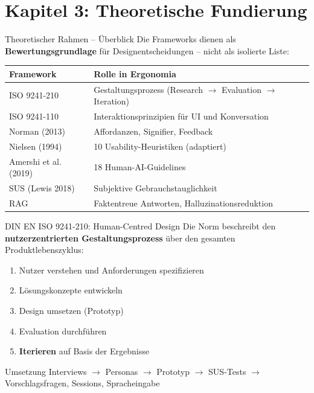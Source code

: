\documentclass[14pt,aspectratio=169]{beamer}
\begin{document}
\section{Kapitel 3: Theoretische Fundierung}

\begin{frame}{Theoretischer Rahmen -- Überblick}
    Die Frameworks dienen als \textbf{Bewertungsgrundlage} für Designentscheidungen -- nicht als isolierte Liste:
    \vspace{0.3cm}
    \begin{tabularx}{\textwidth}{@{}l X@{}}
        \toprule
        \textbf{Framework} & \textbf{Rolle in Ergonomia} \\
        \midrule
        ISO 9241-210 & Gestaltungsprozess (Research $\rightarrow$ Evaluation $\rightarrow$ Iteration) \\
        ISO 9241-110 & Interaktionsprinzipien für UI und Konversation \\
        Norman (2013) & Affordanzen, Signifier, Feedback \\
        Nielsen (1994) & 10 Usability-Heuristiken (adaptiert) \\
        Amershi et al. (2019) & 18 Human-AI-Guidelines \\
        SUS (Lewis 2018) & Subjektive Gebrauchstauglichkeit \\
        RAG & Faktentreue Antworten, Halluzinationsreduktion \\
        \bottomrule
    \end{tabularx}
\end{frame}

\begin{frame}{DIN EN ISO 9241-210: Human-Centred Design}
    Die Norm beschreibt den \textbf{nutzerzentrierten Gestaltungsprozess} über den gesamten Produktlebenszyklus:
    \begin{enumerate}
        \item Nutzer verstehen und Anforderungen spezifizieren
        \item Lösungskonzepte entwickeln
        \item Design umsetzen (Prototyp)
        \item Evaluation durchführen
        \item \textbf{Iterieren} auf Basis der Ergebnisse
    \end{enumerate}
    \vspace{0.3cm}
    \begin{exampleblock}{Umsetzung}
        Interviews $\rightarrow$ Personas $\rightarrow$ Prototyp $\rightarrow$ SUS-Tests $\rightarrow$ Vorschlagsfragen, Sessions, Spracheingabe
    \end{exampleblock}
\end{frame}
\end{document}
